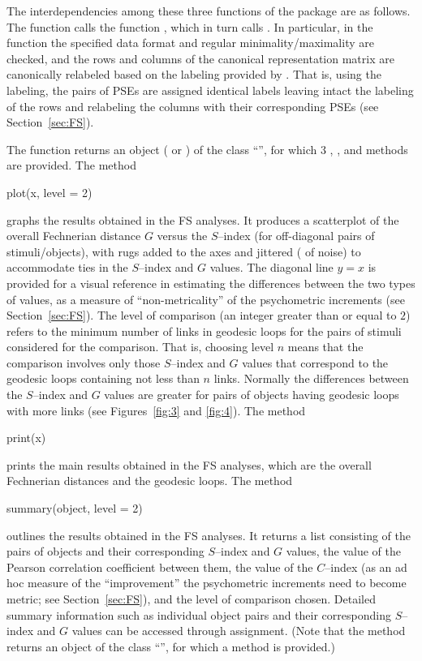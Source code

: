\documentclass[nojss]{jss}
\begin{document}
The interdependencies among these three functions of the package are as follows. 
The function  calls the function , which in turn calls .  In particular, in the function 
the specified data format and regular 
minimality/maximality are checked, and the rows and columns of the canonical representation matrix are canonically relabeled 
based on the labeling provided by . 
That is, using the  labeling, the pairs of PSEs are assigned identical labels leaving intact the labeling of the rows and relabeling the 
columns with their corresponding PSEs (see Section~\ref{sec:FS}).

The function  returns an object ( or ) of the class ``'', 
for which 3 , , and  methods are provided.
The  method 
\begin{Code}
plot(x, level = 2)
\end{Code}
graphs the results obtained in the FS analyses. It produces a scatterplot of the overall Fechnerian distance $G$ versus the $S$--index
(for off-diagonal pairs of stimuli/objects), with rugs added to the axes and jittered ( of noise) to accommodate ties in the $S$--index and $G$ values. 
The diagonal line $y = x$ is provided for a visual reference in estimating the differences between the two types of values, as a measure of ``non-metricality'' 
of the psychometric increments (see Section~\ref{sec:FS}).
The level of comparison (an integer greater than or equal to $2$) refers to the minimum number of links in geodesic loops for the pairs of stimuli considered for the comparison.
That is, choosing level $n$ means that the comparison involves only those $S$--index and $G$ values that correspond to the geodesic loops 
containing not less than $n$ links. Normally the differences between the $S$--index and $G$ values are greater for pairs of objects
having geodesic loops with more links (see Figures~\ref{fig:3} and \ref{fig:4}).
The  method 
\begin{Code}
print(x)
\end{Code}
prints the main results obtained in the FS analyses, which are the overall Fechnerian distances 
and the geodesic loops. 
The  method 
\begin{Code}
summary(object, level = 2)
\end{Code}
outlines the results obtained in the FS analyses. It returns a list  
consisting of the pairs of objects and their corresponding $S$--index and $G$ values, the value of the Pearson correlation coefficient between them,
the value of the $C$--index (as an ad hoc measure of the ``improvement'' the psychometric increments need to become metric; 
see Section~\ref{sec:FS}), and the level of comparison chosen. 
Detailed summary information such as individual object pairs and their 
corresponding $S$--index and $G$ values can be accessed through assignment.
(Note that the  method returns an object of the class ``'', 
for which a  method is provided.)
\end{document}
